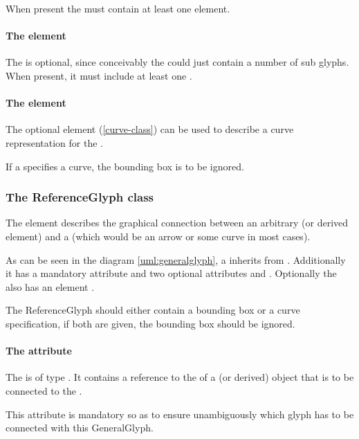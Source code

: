When present the  must contain at least one element. 

\paragraph {The  element}
\label{listofreferenceglyphs-class}
The \ListOfReferenceGlyphs is optional, since conceivably the 
\GeneralGlyph could just contain a number of sub glyphs. When present, 
it must include at least one \ReferenceGlyph. 


\paragraph {The  element}
The optional \Curve element (\ref{curve-class}) can be used to describe 
a curve representation for the \GeneralGlyph. 

If a \GeneralGlyph specifies a curve, the bounding box is to be ignored. 

\subsubsection{The ReferenceGlyph class}
\label{referenceglyph-class}
The  element describes the graphical connection 
between an arbitrary \GraphicalObject (or derived element) and a 
\GeneralGlyph (which would be an arrow or some curve in most cases). 

As can be seen in the diagram \ref{uml:generalglyph}, a \ReferenceGlyph 
inherits from \GraphicalObject. Additionally it has a mandatory 
attribute  and two optional attributes  
and . Optionally the \ReferenceGlyph also has an element 
. 

The ReferenceGlyph should either contain a bounding box or a curve 
specification, if both are given, the bounding box should be ignored. 

\paragraph{The  attribute}
The  is of type . It contains a reference 
to the  of a \GraphicalObject (or derived) object that is to 
be connected to the \GeneralGlyph. 

This attribute is mandatory so as to ensure unambiguously which glyph has to be 
connected with this GeneralGlyph. 


